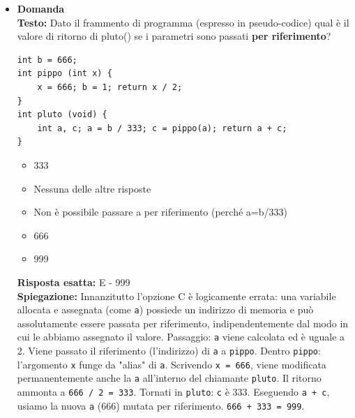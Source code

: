 \documentclass[12pt, a4paper]{article}
\newcounter{domandateoria}
\begin{document}
\begin{itemize}
    \item {}\textbf{Domanda \thedomandateoria} \\
    \textbf{Testo:} Dato il frammento di programma (espresso in pseudo-codice) qual è il valore di ritorno di pluto() se i parametri sono passati \textbf{per riferimento}?
\begin{verbatim}
int b = 666;
int pippo (int x) {
    x = 666; b = 1; return x / 2;
}
int pluto (void) {
    int a, c; a = b / 333; c = pippo(a); return a + c;
}
\end{verbatim}
    \begin{itemize}
        \item[A)] 333
        \item[B)] Nessuna delle altre risposte
        \item[C)] Non è possibile passare a per riferimento (perché a=b/333)
        \item[D)] 666
        \item[E)] 999
    \end{itemize}
    \textbf{Risposta esatta:} E - 999 \\
    \textbf{Spiegazione:} Innanzitutto l'opzione C è logicamente errata: una variabile allocata e assegnata (come \texttt{a}) possiede un indirizzo di memoria e può assolutamente essere passata per riferimento, indipendentemente dal modo in cui le abbiamo assegnato il valore.
    Passaggio: \texttt{a} viene calcolata ed è uguale a 2. Viene passato il riferimento (l'indirizzo) di \texttt{a} a \texttt{pippo}.
    Dentro \texttt{pippo}: l'argomento \texttt{x} funge da "alias" di \texttt{a}. Scrivendo \texttt{x = 666}, viene modificata permanentemente anche la \texttt{a} all'interno del chiamante \texttt{pluto}. Il ritorno ammonta a \texttt{666 / 2 = 333}.
    Tornati in \texttt{pluto}: \texttt{c} è 333. Eseguendo \texttt{a + c}, usiamo la nuova \texttt{a} (666) mutata per riferimento. \texttt{666 + 333 = 999}.
    \vspace{0.3cm}


\end{itemize}
\end{document}

